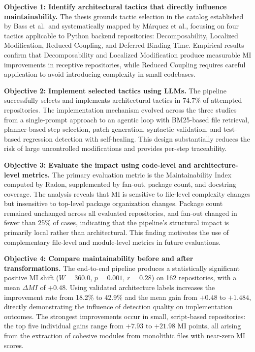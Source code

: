 \textbf{Objective 1: Identify architectural tactics that directly influence maintainability.}
The thesis grounds tactic selection in the catalog established by Bass et al.\ and systematically mapped by M\'arquez et al., focusing on four tactics applicable to Python backend repositories: Decomposability, Localized Modification, Reduced Coupling, and Deferred Binding Time. Empirical results confirm that Decomposability and Localized Modification produce measurable MI improvements in receptive repositories, while Reduced Coupling requires careful application to avoid introducing complexity in small codebases.

\textbf{Objective 2: Implement selected tactics using LLMs.}
The pipeline successfully selects and implements architectural tactics in 74.7\% of attempted repositories. The implementation mechanism evolved across the three studies from a single-prompt approach to an agentic loop with BM25-based file retrieval, planner-based step selection, patch generation, syntactic validation, and test-based regression detection with self-healing. This design substantially reduces the risk of large uncontrolled modifications and provides per-step traceability.

\textbf{Objective 3: Evaluate the impact using code-level and architecture-level metrics.}
The primary evaluation metric is the Maintainability Index computed by Radon, supplemented by fan-out, package count, and docstring coverage. The analysis reveals that MI is sensitive to file-level complexity changes but insensitive to top-level package organization changes. Package count remained unchanged across all evaluated repositories, and fan-out changed in fewer than 25\% of cases, indicating that the pipeline's structural impact is primarily local rather than architectural. This finding motivates the use of complementary file-level and module-level metrics in future evaluations.

\textbf{Objective 4: Compare maintainability before and after transformations.}
The end-to-end pipeline produces a statistically significant positive MI shift ($W = 360.0$, $p = 0.001$, $r = 0.28$) on 162 repositories, with a mean $\Delta MI$ of $+0.48$. Using validated architecture labels increases the improvement rate from 18.2\% to 42.9\% and the mean gain from $+0.48$ to $+1.484$, directly demonstrating the influence of detection quality on implementation outcomes. The strongest improvements occur in small, script-based repositories: the top five individual gains range from $+7.93$ to $+21.98$ MI points, all arising from the extraction of cohesive modules from monolithic files with near-zero MI scores.

